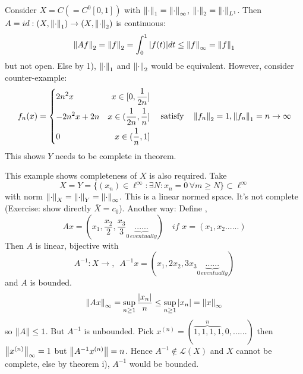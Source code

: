 \begin{example}[Completeness of $Y$]\nl
Consider $X=C(=C^0[0,1])$ with $\left\|{\cdot}\right\|_1=\left\|{\cdot}\right\|_\infty$, $\left\|{\cdot}\right\|_2=\left\|{\cdot}\right\|_{L^1}$. Then $A=id:(X,\left\|{\cdot}\right\|_1)\to(X,\left\|{\cdot}\right\|_2)$ is continuous:
$$
\left\|{Af}\right\|_2
=\left\|{f}\right\|_2
=\int_0^1|f(t)|dt
\leq\left\|{f}\right\|_\infty
=\left\|{f}\right\|_1
$$
but not open. Else by 1),  $\left\|{\cdot}\right\|_1$ and $\left\|{\cdot}\right\|_2$ would be equivalent. However, consider counter-example:
\begin{equation}\nonumber
f_n(x)=\left\{
\begin{aligned}
    &{2n^2x} &x\in[0,\frac{1}{2n}]\\
    &{-2n^2x+2n} &x\in(\frac{1}{2n},\frac{1}{n}]\\
    &0 &x\in(\frac{1}{n},1]\\
\end{aligned}
\right.\quad\text{satisfy}\quad\left\|{f_n}\right\|_2=1,\left\|{f_n}\right\|_1=n\to\infty
\end{equation}
This shows $Y$ needs to be complete in theorem.
\end{example}
\begin{example}[Completeness of $X$]\nl
This example shows completeness of $X$ is also required.
Take 
$$
X=Y=\{(x_n)\in\ell^\infty:\exists N:x_n=0\,\forall m\geq N\}\subset\ell^\infty
$$
with norm $\left\|{\cdot}\right\|_X=\left\|{\cdot}\right\|_Y=\left\|{\cdot}\right\|_\infty$. This is a linear normed space. It's not complete (Exercise: show directly $\overline{X}=c_0$). Another way:
Define , 
$$
Ax=(x_1,\frac{x_2}{2},\frac{x_3}{3}\underbrace{......}_{0\,eventually})\quad if \,\,x=(x_1,x_2......)
$$
Then $A$ is linear, bijective with 
$$
A^{-1}:X\to ,\,\,\,A^{-1}x=(x_1,2x_2,3x_3\underbrace{......}_{0\,eventually})
$$
and $A$ is bounded. 
$$
\left\|{Ax}\right\|_\infty=\sup_{n\geq1}\frac{|x_n|}{n}\leq\sup_{n\geq1}|x_n|=\left\|{x}\right\|_\infty
$$
so $\left\|{A}\right\|\leq1$. But $A^{-1}$ is unbounded. 
Pick $x^{(n)}=(\overbrace{1,1,1,1}^{n},0,......)$ then $\left\|{x^{(n)}}\right\|_\infty=1$ but $\left\|{A^{-1}x^{(n)}}\right\|=n$. Hence $A^{-1}\not\in\mathcal{L}(X)$ and $X$ cannot be complete, else by theorem i), $A^{-1}$ would be bounded.
\end{example}

